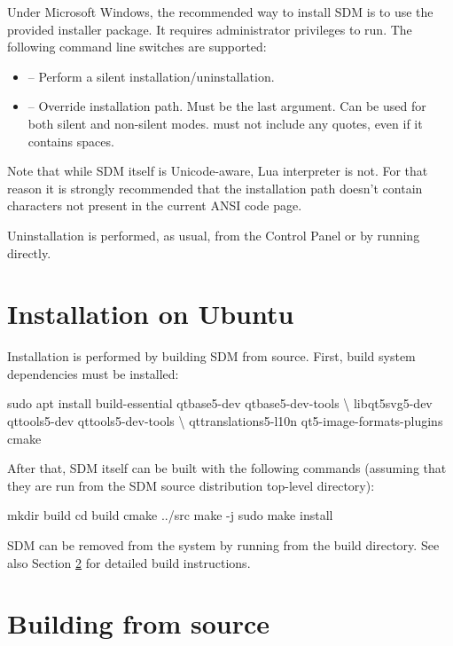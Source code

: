 \documentclass[a4paper,12pt,twoside,extrafontsizes]{memoir}
\begin{document}
Under Microsoft Windows, the recommended way to install SDM is to use the provided installer package. It requires administrator privileges to run. The following command line switches are supported:

\begin{itemize}
	\item {} -- Perform a silent installation/uninstallation.
	\item {} -- Override installation path. Must be the last argument. Can be used for both silent and non-silent modes.  must not include any quotes, even if it contains spaces.
\end{itemize}

Note that while SDM itself is Unicode-aware, Lua interpreter is not. For that reason it is strongly recommended that the installation path doesn't contain characters not present in the current ANSI code page.

Uninstallation is performed, as usual, from the Control Panel or by running  directly.

\section{Installation on Ubuntu}

Installation is performed by building SDM from source. First, build system dependencies must be installed:

\begin{shellcmds}
sudo apt install build-essential qtbase5-dev qtbase5-dev-tools \textbackslash
    libqt5svg5-dev qttools5-dev qttools5-dev-tools \textbackslash
    qttranslations5-l10n qt5-image-formats-plugins cmake
\end{shellcmds}

After that, SDM itself can be built with the following commands (assuming that they are run from the SDM source distribution top-level directory):

\begin{shellcmds}
mkdir build
cd build
cmake ../src
make -j
sudo make install
\end{shellcmds}

SDM can be removed from the system by running  from the build directory. See also Section \ref{sec:buildsource} for detailed build instructions.

\section{Building from source}
\label{sec:buildsource}
\end{document}
